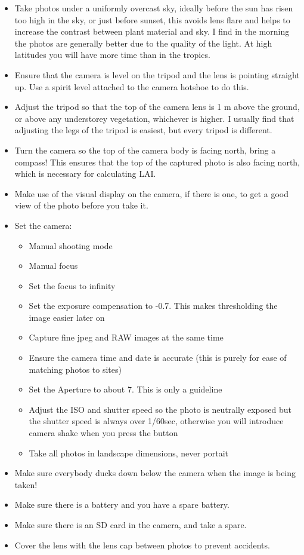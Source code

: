 \documentclass{article}
\begin{document}
\begin{itemize}
	\item{Take photos under a uniformly overcast sky, ideally before the sun has risen too high in the sky, or just before sunset, this avoids lens flare and helps to increase the contrast between plant material and sky. I find in the morning the photos are generally better due to the quality of the light. At high latitudes you will have more time than in the tropics.}
	\item{Ensure that the camera is level on the tripod and the lens is pointing straight up. Use a spirit level attached to the camera hotshoe to do this.}
	\item{Adjust the tripod so that the top of the camera lens is 1 m above the ground, or above any understorey vegetation, whichever is higher. I usually find that adjusting the legs of the tripod is easiest, but every tripod is different.}
	\item{Turn the camera so the top of the camera body is facing north, bring a compass! This ensures that the top of the captured photo is also facing north, which is necessary for calculating LAI.}
	\item{Make use of the visual display on the camera, if there is one, to get a good view of the photo before you take it.}
	\item{Set the camera:}
		\begin{itemize}
			\item{Manual shooting mode}
			\item{Manual focus}
			\item{Set the focus to infinity}
			\item{Set the exposure compensation to -0.7. This makes thresholding the image easier later on}
			\item{Capture fine jpeg and RAW images at the same time}
			\item{Ensure the camera time and date is accurate (this is purely for ease of matching photos to sites)}
			\item{Set the Aperture to about 7. This is only a guideline}
			\item{Adjust the ISO and shutter speed so the photo is neutrally exposed but the shutter speed is always over 1/60sec, otherwise you will introduce camera shake when you press the button}
			\item{Take all photos in landscape dimensions, never portait}
		\end{itemize}
	\item{Make sure everybody ducks down below the camera when the image is being taken!}
	\item{Make sure there is a battery and you have a spare battery.}
	\item{Make sure there is an SD card in the camera, and take a spare.}
	\item{Cover the lens with the lens cap between photos to prevent accidents.}
\end{itemize}
\end{document}
